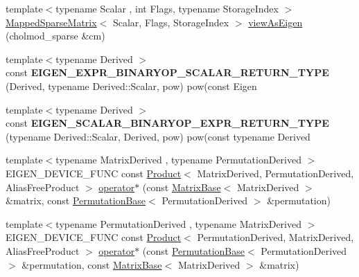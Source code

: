 \begin{DoxyCompactItemize}
\item 
{\footnotesize template$<$typename Scalar , int Flags, typename Storage\+Index $>$ }\\\hyperlink{class_eigen_1_1_mapped_sparse_matrix}{Mapped\+Sparse\+Matrix}$<$ Scalar, Flags, Storage\+Index $>$ \hyperlink{namespace_eigen_af13cf1742b9a7a03703e8e5393bb6f86}{view\+As\+Eigen} (cholmod\+\_\+sparse \&cm)
\item 
\mbox{\label{namespace_eigen_a2828f232bc2ae1e3bdbc6d45281a3cb9}} 
{\footnotesize template$<$typename Derived $>$ }\\const {\bfseries E\+I\+G\+E\+N\+\_\+\+E\+X\+P\+R\+\_\+\+B\+I\+N\+A\+R\+Y\+O\+P\+\_\+\+S\+C\+A\+L\+A\+R\+\_\+\+R\+E\+T\+U\+R\+N\+\_\+\+T\+Y\+PE} (Derived, typename Derived\+::\+Scalar, pow) pow(const Eigen
\item 
\mbox{\label{namespace_eigen_afc612da3483ee285f4c3375af03b7cf8}} 
{\footnotesize template$<$typename Derived $>$ }\\const {\bfseries E\+I\+G\+E\+N\+\_\+\+S\+C\+A\+L\+A\+R\+\_\+\+B\+I\+N\+A\+R\+Y\+O\+P\+\_\+\+E\+X\+P\+R\+\_\+\+R\+E\+T\+U\+R\+N\+\_\+\+T\+Y\+PE} (typename Derived\+::\+Scalar, Derived, pow) pow(const typename Derived
\item 
{\footnotesize template$<$typename Matrix\+Derived , typename Permutation\+Derived $>$ }\\E\+I\+G\+E\+N\+\_\+\+D\+E\+V\+I\+C\+E\+\_\+\+F\+U\+NC const \hyperlink{group___core___module_class_eigen_1_1_product}{Product}$<$ Matrix\+Derived, Permutation\+Derived, Alias\+Free\+Product $>$ \hyperlink{namespace_eigen_a32970f7eb62fe31eeefee72d24a046d0}{operator$\ast$} (const \hyperlink{group___core___module_class_eigen_1_1_matrix_base}{Matrix\+Base}$<$ Matrix\+Derived $>$ \&matrix, const \hyperlink{group___core___module_class_eigen_1_1_permutation_base}{Permutation\+Base}$<$ Permutation\+Derived $>$ \&permutation)
\item 
{\footnotesize template$<$typename Permutation\+Derived , typename Matrix\+Derived $>$ }\\E\+I\+G\+E\+N\+\_\+\+D\+E\+V\+I\+C\+E\+\_\+\+F\+U\+NC const \hyperlink{group___core___module_class_eigen_1_1_product}{Product}$<$ Permutation\+Derived, Matrix\+Derived, Alias\+Free\+Product $>$ \hyperlink{namespace_eigen_a5954e0288e506706e8d2c8cd5ff5b7d2}{operator$\ast$} (const \hyperlink{group___core___module_class_eigen_1_1_permutation_base}{Permutation\+Base}$<$ Permutation\+Derived $>$ \&permutation, const \hyperlink{group___core___module_class_eigen_1_1_matrix_base}{Matrix\+Base}$<$ Matrix\+Derived $>$ \&matrix)

\end{DoxyCompactItemize}
